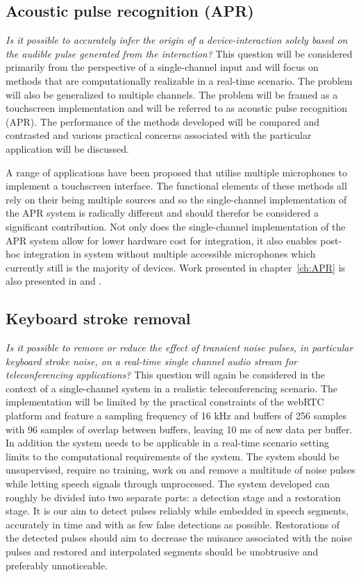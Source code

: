 \subsection{Acoustic pulse recognition (APR)}
\emph{Is it possible to accurately infer the origin of a device-interaction solely based on the audible pulse generated from the interaction?} 
This question will be considered primarily from the perspective of a single-channel input and will focus on methods that are computationally realizable in a real-time scenario. The problem will also be generalized to multiple channels. The problem will be framed as a touchscreen implementation and will be referred to as acoustic pulse recognition (APR). The performance of the methods developed will be compared and contrasted and various practical concerns associated with the particular application will be discussed.

A range of applications have been proposed that utilise multiple microphones to implement a touchscreen interface\cite{US8174547}\cite{US8233353}\cite{TouchSystems2006}\cite{US7411581}\cite{WO2006108443}. The functional elements of these methods all rely on their being multiple sources and so the single-channel implementation of the APR system is radically different and should therefor be considered a significant contribution. Not only does the single-channel implementation of the APR system allow for lower hardware cost for integration, it also enables post-hoc integration in system without multiple accessible microphones which currently still is the majority of devices. Work presented in chapter~\ref{ch:APR} is also presented in \cite{Christensen2011} and \cite{US20110316784}.

\subsection{Keyboard stroke removal}
\emph{Is it possible to remove or reduce the effect of transient noise pulses, in particular keyboard stroke noise, on a real-time single channel audio stream for teleconferencing applications?}
This question will again be considered in the context of a single-channel system in a realistic teleconferencing scenario. The implementation will be limited by the practical constraints of the webRTC platform and feature a sampling frequency of 16 kHz and buffers of 256 samples with 96 samples of overlap between buffers, leaving 10 ms of new data per buffer. In addition the system needs to be applicable in a real-time scenario setting limits to the computational requirements of the system. The system should be unsupervised, require no training, work on and remove a multitude of noise pulses while letting speech signals through unprocessed. The system developed can roughly be divided into two separate parts: a detection stage and a restoration stage. It is our aim to detect pulses reliably while embedded in speech segments, accurately in time and with as few false detections as possible. Restorations of the detected pulses should aim to decrease the nuisance associated with the noise pulses and restored and interpolated segments should be unobtrusive and preferably unnoticeable.

